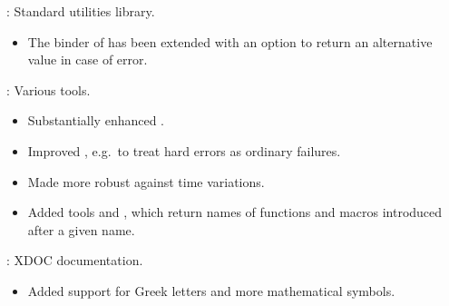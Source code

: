 \begin{frame}

\implibtitle

:
Standard utilities library.
\begin{itemize}
\item The  binder of  has been extended with
      an option  to return an alternative value in case of error.
\end{itemize}

\end{frame}


\begin{frame}

\implibtitle

:
Various tools.
\begin{itemize}
\item Substantially enhanced .
\item Improved , e.g.\ to treat hard errors as ordinary failures.
\item Made  more robust against time variations.
\item Added tools  and ,
      which return names of functions and macros introduced after a given name.
\end{itemize}

\end{frame}


\begin{frame}

\implibtitle

:
XDOC documentation.
\begin{itemize}
\item Added support for Greek letters and more mathematical symbols.
\end{itemize}

\end{frame}



